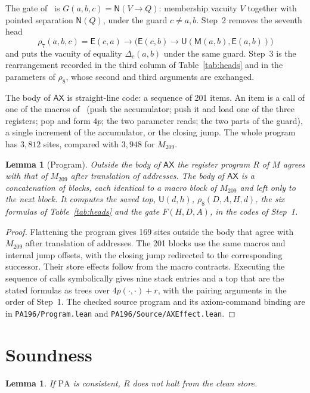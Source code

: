 \documentclass[11pt,letterpaper]{article}
\newtheorem{lemma}[theorem]{Lemma}
\newcommand{\PA}{\mathrm{PA}}
\newcommand{\ax}{\mathsf{AX}}
\newcommand{\Mc}{\mathsf{M}}
\newcommand{\Uc}{\mathsf{U}}
\newcommand{\Ec}{\mathsf{E}}
\newcommand{\Nc}{\mathsf{N}}
\newcommand{\file}[1]{\texttt{\nolinkurl{#1}}}
\begin{document}
The gate of~\cite{pa209} is $G(a,b,c)=\Nc(V\to Q)$:
membership vacuity $V$ together with pointed separation $\Nc(Q)$,
under the guard $c\ne a,b$. Step~2 removes the seventh head
\[
 \rho_7(a,b,c)=\Ec(c,a)\to\bigl(\Ec(c,b)\to\Uc(\Mc(a,b),\Ec(a,b))\bigr)
\]
and puts the vacuity of equality $\Delta_c(a,b)$ under the same guard.
Step~3 is the rearrangement recorded in the third column of
Table~\ref{tab:heads} and in the parameters of $\rho_8$, whose second
and third arguments are exchanged.

The body of $\ax$ is straight-line code: a sequence of 201 items. An
item is a call of one of the macros of~\cite{pa209} (push the
accumulator; push it and load one of the three registers; pop and form
$4p$; the two parameter reads; the two parts of the guard), a single
increment of the accumulator, or the closing jump. The whole program
has $3{,}812$ sites, compared with $3{,}948$ for $M_{209}$.

\begin{lemma}[Program]\label{lem:program}
Outside the body of $\ax$ the register program $R$ of $M$ agrees with
that of $M_{209}$ after translation of addresses. The body of $\ax$ is a concatenation of blocks, each
identical to a macro block of $M_{209}$ and left only to the next
block. It computes the saved top, $\Uc(d,h)$, $\rho_8(D,A,H,d)$, the
six formulas of Table~\ref{tab:heads} and the gate $F(H,D,A)$, in the
codes of Step~1.
\end{lemma}

\begin{proof}
Flattening the program gives 169 sites outside the body that agree
with $M_{209}$ after translation of addresses. The 201 blocks use the
same macros and internal jump offsets, with the closing jump
redirected to the corresponding successor. Their store effects follow
from the macro contracts. Executing the sequence of calls symbolically
gives nine stack entries and a top that are the stated formulas as
trees over $4p(\cdot,\cdot)+r$, with the pairing arguments in the order
of Step~1. The checked source program and its axiom-command binding
are in \file{PA196/Program.lean} and \file{PA196/Source/AXEffect.lean}.
\end{proof}

\section{Soundness}\label{sec:sound}

\begin{lemma}\label{lem:sound}
If $\PA$ is consistent, $R$ does not halt from the clean store.
\end{lemma}
\end{document}
